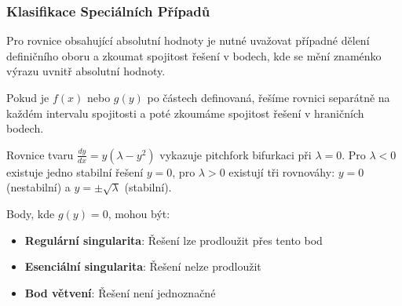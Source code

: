 \vspace{0.8\baselineskip}

\subsubsection{Klasifikace Speciálních Případů}
\label{subsubsec:klasifikace-specialnich-pripadu}

\begin{remark}
Pro rovnice obsahující absolutní hodnoty je nutné uvažovat případné dělení definičního oboru a zkoumat spojitost řešení v bodech, kde se mění znaménko výrazu uvnitř absolutní hodnoty.
\end{remark}

\vspace{0.6\baselineskip}

\begin{remark}
Pokud je $f(x)$ nebo $g(y)$ po částech definovaná, řešíme rovnici separátně na každém intervalu spojitosti a poté zkoumáme spojitost řešení v hraničních bodech.
\end{remark}

\vspace{0.6\baselineskip}

\begin{remark}
Rovnice tvaru $\frac{dy}{dx} = y(\lambda - y^2)$ vykazuje pitchfork bifurkaci při $\lambda = 0$. Pro $\lambda < 0$ existuje jedno stabilní řešení $y = 0$, pro $\lambda > 0$ existují tři rovnováhy: $y = 0$ (nestabilní) a $y = \pm\sqrt{\lambda}$ (stabilní).
\end{remark}

\vspace{0.6\baselineskip}

\begin{remark}
Body, kde $g(y) = 0$, mohou být:
\begin{itemize}
\item \textbf{Regulární singularita}: Řešení lze prodloužit přes tento bod
\item \textbf{Esenciální singularita}: Řešení nelze prodloužit
\item \textbf{Bod větvení}: Řešení není jednoznačné
\end{itemize}
\end{remark}

\vspace{0.8\baselineskip}

